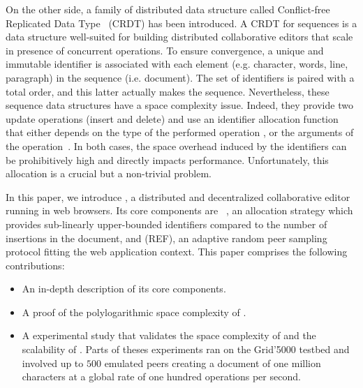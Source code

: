 On the other side, a family of distributed data structure called Conflict-free
Replicated Data Type~\cite{shapiro2011comprehensive, shapiro2011conflict} (CRDT)
has been introduced. A CRDT for sequences is a data structure well-suited for
building distributed collaborative editors that scale in presence of concurrent
operations. To ensure convergence, a unique and immutable identifier is
associated with each element (e.g. character, words, line, paragraph) in the
sequence (i.e. document). The set of identifiers is paired with a total order,
and this latter actually makes the sequence.  Nevertheless, these sequence data
structures have a space complexity issue. Indeed, they provide two update
operations (insert and delete) and use an identifier allocation function that
either depends on the type of the performed operation \cite{ahmed2011evaluating,
  conway2014language, grishchenko2010deep, oster2006data,
  preguica2009commutative, roh2011replicated, weiss2007wooki, wu2010partial,
  Yu2012stringwise}, or the arguments of the operation~\cite
{preguica2009commutative, andre2013supporting,weiss2009logoot}. In both cases,
the space overhead induced by the identifiers can be prohibitively high and
directly impacts performance. Unfortunately, this allocation is a crucial but a
non-trivial problem.

In this paper, we introduce \CRATE, a distributed and decentralized
collaborative editor running in web browsers. Its core components are
\LSEQ~\cite{nedelec2013concurrency, nedelec2013lseq}, an allocation strategy
which provides sub-linearly upper-bounded identifiers compared to the number of
insertions in the document, and \SPRAY (REF), an adaptive random peer sampling
protocol fitting the web application context. This paper comprises the following
contributions: 
\begin{itemize}
\item An in-depth description of its core components.
\item A proof of the polylogarithmic space complexity of \LSEQ.
\item A experimental study that validates the space complexity of \LSEQ and the
  scalability of \CRATE. Parts of theses experiments ran on the Grid'5000
  testbed and involved up to $500$ emulated peers creating a document of one
  million characters at a global rate of one hundred operations per second.
\end{itemize}

